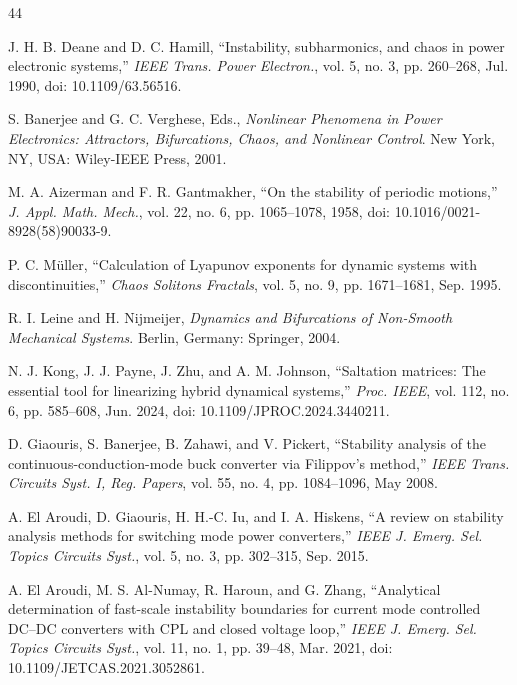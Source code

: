 \documentclass[journal]{IEEEtran}
\begin{document}
\begin{thebibliography}{44}

 J. H. B. Deane and D. C. Hamill,
``Instability, subharmonics, and chaos in power electronic systems,''
\emph{IEEE Trans. Power Electron.}, vol. 5, no. 3, pp. 260--268, Jul. 1990,
doi: 10.1109/63.56516.

 S. Banerjee and G. C. Verghese, Eds.,
\emph{Nonlinear Phenomena in Power Electronics: Attractors, Bifurcations,
Chaos, and Nonlinear Control}. New York, NY, USA: Wiley-IEEE Press, 2001.

 M. A. Aizerman and F. R. Gantmakher, ``On the
stability of periodic motions,'' \emph{J. Appl. Math. Mech.}, vol. 22,
no. 6, pp. 1065--1078, 1958, doi: 10.1016/0021-8928(58)90033-9.

 P. C. M\"uller, ``Calculation of Lyapunov exponents for
dynamic systems with discontinuities,'' \emph{Chaos Solitons Fractals},
vol. 5, no. 9, pp. 1671--1681, Sep. 1995.

 R. I. Leine and H. Nijmeijer, \emph{Dynamics and
Bifurcations of Non-Smooth Mechanical Systems}. Berlin, Germany: Springer, 2004.

 N. J. Kong, J. J. Payne, J. Zhu, and
A. M. Johnson, ``Saltation matrices: The essential tool for linearizing
hybrid dynamical systems,'' \emph{Proc. IEEE}, vol. 112, no. 6,
pp. 585--608, Jun. 2024, doi: 10.1109/JPROC.2024.3440211.

 D. Giaouris, S. Banerjee, B. Zahawi, and
V. Pickert, ``Stability analysis of the continuous-conduction-mode buck
converter via Filippov's method,'' \emph{IEEE Trans. Circuits Syst. I,
Reg. Papers}, vol. 55, no. 4, pp. 1084--1096, May 2008.

 A. El Aroudi, D. Giaouris, H. H.-C. Iu, and
I. A. Hiskens, ``A review on stability analysis methods for switching mode
power converters,'' \emph{IEEE J. Emerg. Sel. Topics Circuits Syst.},
vol. 5, no. 3, pp. 302--315, Sep. 2015.

 A. El Aroudi, M. S. Al-Numay, R. Haroun,
and G. Zhang, ``Analytical determination of fast-scale instability
boundaries for current mode controlled DC--DC converters with CPL and closed
voltage loop,'' \emph{IEEE J. Emerg. Sel. Topics Circuits Syst.}, vol. 11,
no. 1, pp. 39--48, Mar. 2021, doi: 10.1109/JETCAS.2021.3052861.


\end{thebibliography}
\end{document}
